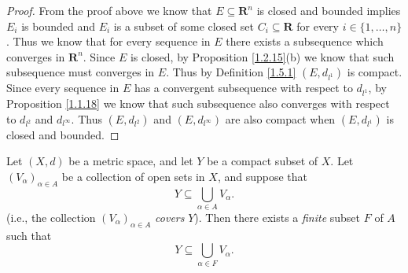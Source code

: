 \begin{proof}
    From the proof above we know that \(E \subseteq \mathbf{R}^n\) is closed and bounded implies \(E_i\) is bounded and \(E_i\) is a subset of some closed set \(C_i \subseteq \mathbf{R}\) for every \(i \in \{1, \dots, n\}\).
    Thus we know that for every sequence in \(E\) there exists a subsequence which converges in \(\mathbf{R}^n\).
    Since \(E\) is closed, by Proposition \ref{1.2.15}(b) we know that such subsequence must converges in \(E\).
    Thus by Definition \ref{1.5.1} \((E, d_{l^1})\) is compact.
    Since every sequence in \(E\) has a convergent subsequence with respect to \(d_{l^1}\), by Proposition \ref{1.1.18} we know that such subsequence also converges with respect to \(d_{l^2}\) and \(d_{l^\infty}\).
    Thus \((E, d_{l^2})\) and \((E, d_{l^\infty})\) are also compact when \((E, d_{l^1})\) is closed and bounded.
\end{proof}

\begin{theorem}\label{1.5.8}
    Let \((X, d)\) be a metric space, and let \(Y\) be a compact subset of \(X\).
    Let \((V_{\alpha})_{\alpha \in A}\) be a collection of open sets in \(X\), and suppose that
    \[
        Y \subseteq \bigcup_{\alpha \in A} V_{\alpha}.
    \]
    (i.e., the collection \((V_{\alpha})_{\alpha \in A}\) \emph{covers} \(Y\)).
    Then there exists a \emph{finite} subset \(F\) of \(A\) such that
    \[
        Y \subseteq \bigcup_{\alpha \in F} V_{\alpha}.
    \]
\end{theorem}

